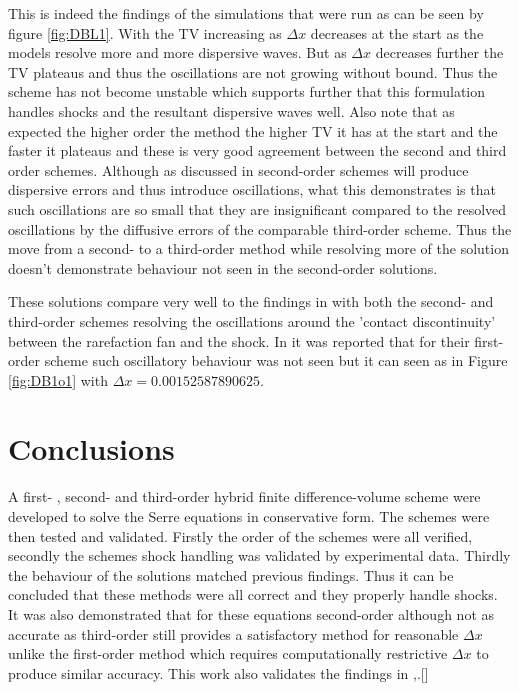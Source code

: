 \documentclass[SingleSpace,12pt]{Serre_ASCE}
\begin{document}
This is indeed the findings of the simulations that were run as can be seen by figure \ref{fig:DBL1}. With the TV increasing as $\Delta x$ decreases at the start as the models resolve more and more dispersive waves. But as $\Delta x$ decreases further the TV plateaus and thus the oscillations are not growing without bound. Thus the scheme has not become unstable which supports further that this formulation handles shocks and the resultant dispersive waves well.  Also note that as expected the higher order the method the higher TV it has at the start and the faster it plateaus and these is very good agreement between the second and third order schemes. Although as discussed in \cite{Zoppou-Roberts-1996} second-order schemes will produce dispersive errors and thus introduce oscillations, what this demonstrates is that such oscillations are so small that they are insignificant compared to the resolved oscillations by the diffusive errors of the comparable third-order scheme. Thus the move from a second- to a third-order method while resolving more of the solution doesn't demonstrate behaviour not seen in the second-order solutions.

These solutions compare very well to the findings in \cite{El-etal-2006} with both the second- and third-order schemes resolving the oscillations around the 'contact discontinuity'\cite{El-etal-2006} between the rarefaction fan and the shock. In \cite{Hank-etal-2010-2034} it was reported that for their first-order scheme such oscillatory behaviour was not seen but it can seen as in Figure \ref{fig:DB1o1} with $\Delta x = 0.00152587890625$.
\section{Conclusions}
\label{section:Conclusions}
A first- , second- and third-order hybrid finite difference-volume scheme were developed to solve the Serre equations in conservative form. The schemes were then tested and validated. Firstly the order of the schemes were all verified, secondly the schemes shock handling was validated by experimental data. Thirdly the behaviour of the solutions matched previous findings. Thus it can be concluded that these methods were all correct and they properly handle shocks. It was also demonstrated that for these equations second-order although not as accurate as third-order still provides a satisfactory method for reasonable $\Delta x$ unlike the first-order method which requires computationally restrictive $\Delta x$ to produce similar accuracy. This work also validates the findings in \cite{El-etal-2006},.[]  
\end{document}
